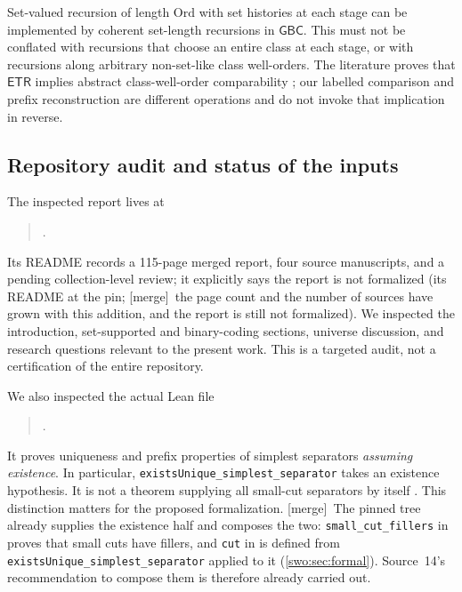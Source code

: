 \documentclass[11pt]{article}
\theoremstyle{definition}
\theoremstyle{remark}
\newcommand{\Ord}{\mathrm{Ord}}
\newcommand{\GBC}{\mathsf{GBC}}
\newcommand{\ETR}{\mathsf{ETR}}
\newcommand{\merge}{\textsf{[merge]}}
\begin{document}
Set-valued recursion of length $\Ord$ with set histories at each stage
can be implemented by coherent set-length recursions in $\GBC$.
This must not be conflated with recursions that choose an entire class
at each stage, or with recursions along arbitrary non-set-like class
well-orders. The literature proves that $\ETR$ implies abstract
class-well-order comparability \cite[Theorem~6]{HamkinsWoodin}; our labelled
comparison and prefix reconstruction are different operations and do
not invoke that implication in reverse.

\subsection{Repository audit and status of the inputs}
The inspected report lives at
\begin{quote}\small
{}.
\end{quote}
Its README records a 115-page merged report, four source manuscripts,
and a pending collection-level review; it explicitly says the report is
not formalized (its README at the pin; \merge\ the page count and the
number of sources have grown with this addition, and the report is still
not formalized). We inspected the introduction,
set-supported and binary-coding sections, universe discussion, and
research questions relevant to the present work. This is a targeted audit,
not a certification of the entire repository.

We also inspected the actual Lean file
\begin{quote}\small
{}.
\end{quote}
It proves uniqueness and prefix properties of simplest separators
\emph{assuming existence}. In particular,
\texttt{existsUnique\_simplest\_separator} takes an existence hypothesis.
It is not a theorem supplying all small-cut separators by itself
\cite{ProveItSimplicity}. This distinction matters for the proposed formalization.
\merge\ The pinned tree already supplies the existence half and composes
the two: \texttt{small\_cut\_fillers} in 
\cite{ProveItCutFill} proves that small cuts have fillers, and
\texttt{cut} in  \cite{ProveItCuts} is
defined from \texttt{existsUnique\_simplest\_separator} applied to it
(\cref{swo:sec:formal}). Source~14's recommendation to compose them is
therefore already carried out.
\end{document}
